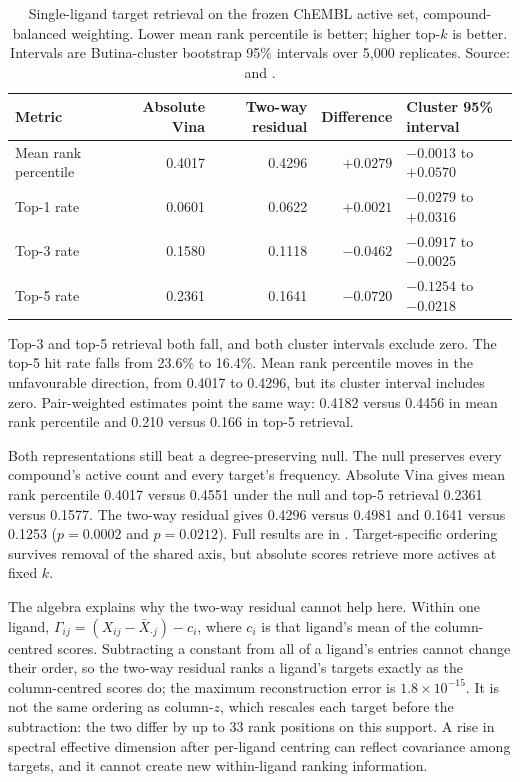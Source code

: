 \begin{table}[htbp]
\centering
\small
\setlength{\tabcolsep}{5pt}
\caption[Single-ligand target retrieval on the frozen ChEMBL active set]{Single-ligand target retrieval on the frozen ChEMBL active set, compound-balanced
weighting. Lower mean rank percentile is better; higher top-$k$ is better. Intervals are
Butina-cluster bootstrap 95\% intervals over 5{,}000 replicates. Source:
 and
.}
\label{tab:s6-ligand}
\begin{tabular}{lrrrl}
\toprule
Metric & Absolute Vina & Two-way residual & Difference & Cluster 95\% interval \\
\midrule
Mean rank percentile & 0.4017 & 0.4296 & $+0.0279$ & $-0.0013$ to $+0.0570$ \\
Top-1 rate           & 0.0601 & 0.0622 & $+0.0021$ & $-0.0279$ to $+0.0316$ \\
Top-3 rate           & 0.1580 & 0.1118 & $-0.0462$ & $-0.0917$ to $-0.0025$ \\
Top-5 rate           & 0.2361 & 0.1641 & $-0.0720$ & $-0.1254$ to $-0.0218$ \\
\bottomrule
\end{tabular}
\end{table}

Top-3 and top-5 retrieval both fall, and both cluster intervals exclude zero. The top-5 hit rate
falls from 23.6\% to 16.4\%. Mean rank percentile moves in the unfavourable direction, from 0.4017 to
0.4296, but its cluster interval includes zero. Pair-weighted estimates point the same way:
0.4182 versus 0.4456 in mean rank percentile and 0.210 versus 0.166 in top-5 retrieval.

Both representations still beat a degree-preserving null. The null preserves every compound's
active count and every target's frequency. Absolute Vina gives mean rank percentile 0.4017 versus
0.4551 under the null and top-5 retrieval 0.2361 versus 0.1577. The two-way residual gives 0.4296
versus 0.4981 and 0.1641 versus 0.1253 ($p=0.0002$ and $p=0.0212$). Full results are in
. Target-specific ordering survives
removal of the shared axis, but absolute scores retrieve more actives at fixed $k$.

The algebra explains why the two-way residual cannot help here. Within one ligand,
$\Gamma_{ij} = (X_{ij} - \bar X_{\cdot j}) - c_i$, where $c_i$ is that ligand's mean of the
column-centred scores. Subtracting a constant from all of a ligand's entries cannot change their
order, so the two-way residual ranks a ligand's targets exactly as the column-centred scores do;
the maximum reconstruction error is $1.8\times10^{-15}$. It is not the same ordering as
column-$z$, which rescales each target before the subtraction: the two differ by up to 33 rank
positions on this support. A rise in spectral effective dimension after per-ligand centring can
reflect covariance among targets, and it cannot create new within-ligand ranking information.

